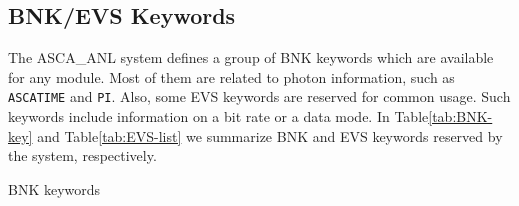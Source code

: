 \subsection{BNK/EVS Keywords}\label{sec:BNK-EVS-key}
The ASCA\_ANL system defines a group of BNK keywords
which are available for any module.
Most of them are related to photon information,
such as {\tt ASCATIME} and {\tt PI}.
Also,
some EVS keywords are reserved for common usage.
Such keywords include information on a bit rate or a data mode.
In Table\ref{tab:BNK-key} and Table\ref{tab:EVS-list}
we summarize BNK and EVS keywords reserved by the system, respectively.

\begin{table}[p]
\begin{center}
\caption{BNK keywords}
\label{tab:BNK-key}
\end{center}
\end{table}

